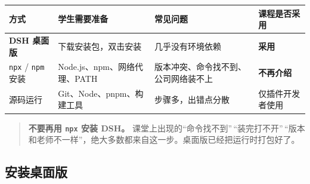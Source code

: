 \begin{longtable}[]{@{}
  >{\raggedright\arraybackslash}p{}
  >{\raggedright\arraybackslash}p{}
  >{\raggedright\arraybackslash}p{}
  >{\raggedright\arraybackslash}p{}@{}}
\toprule\noalign{}
\begin{minipage}[b]{\linewidth}\raggedright
方式
\end{minipage} & \begin{minipage}[b]{\linewidth}\raggedright
学生需要准备
\end{minipage} & \begin{minipage}[b]{\linewidth}\raggedright
常见问题
\end{minipage} & \begin{minipage}[b]{\linewidth}\raggedright
课程是否采用
\end{minipage} \\
\midrule\noalign{}
\endhead
\bottomrule\noalign{}
\endlastfoot
\textbf{DSH 桌面版} & 下载安装包，双击安装 & 几乎没有环境依赖 &
\textbf{采用} \\
\passthrough{\lstinline!npx!} / \passthrough{\lstinline!npm!} 安装 &
Node.js、npm、网络代理、PATH & 版本冲突、命令找不到、公司网络装不上 &
\textbf{不再介绍} \\
源码运行 & Git、Node、pnpm、构建工具 & 步骤多，出错点分散 &
仅插件开发者使用 \\
\end{longtable}

\begin{quote}
\textbf{不要再用 \passthrough{\lstinline!npx!} 安装 DSH。}
课堂上出现的``命令找不到''\,``装完打不开''\,``版本和老师不一样''，绝大多数都来自这一步。桌面版已经把运行时打包好了。
\end{quote}

\subsection{安装桌面版}\label{ux5b89ux88c5ux684cux9762ux7248}

